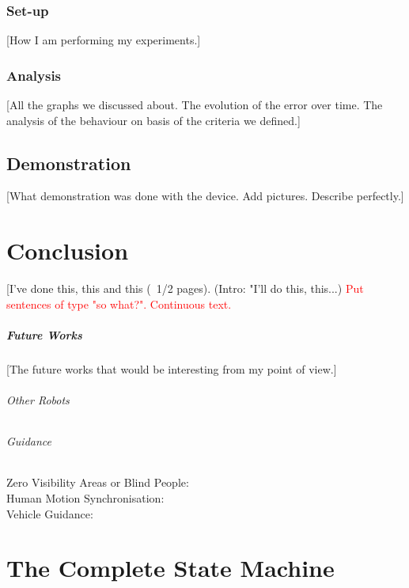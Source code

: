 \documentclass[oneside, a4paper, 12pt]{memoir}
\begin{document}
		\subsection{Set-up}
		
		[How I am performing my experiments.]
		
		\subsection{Analysis}
		
		[All the graphs we discussed about. The evolution of the error over time. The analysis of the behaviour on basis of the criteria we defined.]
		
	\section{Demonstration}
	
	[What demonstration was done with the device. Add pictures. Describe perfectly.]

\chapter{Conclusion}

[I've done this, this and this (~1/2 pages). (Intro: "I'll do this, this...) \textcolor{red}{Put sentences of type "so what?". Continuous text.}

	\paragraph{Future Works}
	[The future works that would be interesting from my point of view.]
	
		\subparagraph{Other Robots}
		\subparagraph{Guidance}
			
			\begin{description}
				\item[Zero Visibility Areas or Blind People:]
				\item[Human Motion Synchronisation:]
				\item[Vehicle Guidance:]
			\end{description}
			


\appendix

\chapter{The Complete State Machine}
\label{app:complete_state_machine}
\end{document}
